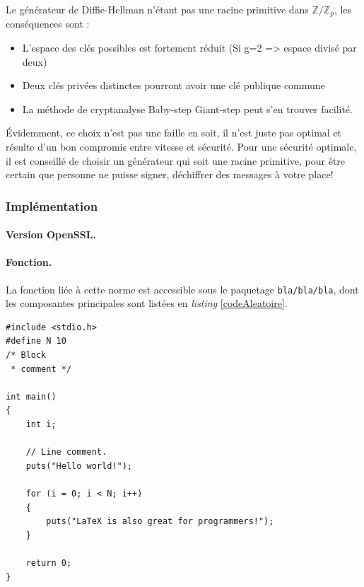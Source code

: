 		Le générateur de Diffie-Hellman n'étant pas une racine primitive dans 
		$\mathbb{Z}/\mathbb{Z}_p$, les conséquences sont :
		\begin{itemize}
		\item L'espace des clés possibles est fortement réduit (Si g=2 => espace 
		divisé par deux)
		\item Deux clés privées distinctes pourront avoir une clé publique commune
		\item La méthode de cryptanalyse Baby-step Giant-step peut s'en trouver 
		facilité.\\
		\end{itemize}
	
		Évidemment, ce choix n'est pas une faille en soit, il n'est juste pas 
		optimal et résulte d'un bon compromis entre vitesse et sécurité.	Pour une sécurité optimale, il est conseillé de choisir un générateur qui 
		soit une racine primitive, pour être certain que personne ne puisse 
		signer, déchiffrer des messages à votre place!\\
	
	
		\subsubsection{Implémentation}
		
		\paragraph{Version OpenSSL.\\}
		
		\paragraph{Fonction.\\}
		La fonction liée à cette norme est accessible sous le paquetage \texttt{bla/bla/bla}, dont les composantes principales sont listées en \textit{listing} \ref{codeAleatoire}.
		
		
		\begin{lstlisting}[style=customc,caption=codeAleatoire.c, label=codeAleatoire]
#include <stdio.h>
#define N 10
/* Block
 * comment */
 
int main()
{
    int i;
 
    // Line comment.
    puts("Hello world!");
 
    for (i = 0; i < N; i++)
    {
        puts("LaTeX is also great for programmers!");
    }
 
    return 0;
}
		\end{lstlisting}
		
